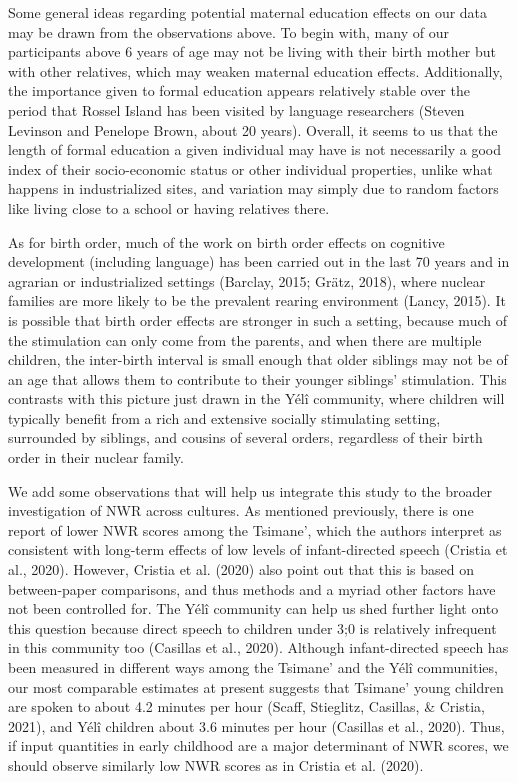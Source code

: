 \documentclass[english,,man,floatsintext]{apa6}
\begin{document}
Some general ideas regarding potential maternal education effects on our data may be drawn from the observations above. To begin with, many of our participants above 6 years of age may not be living with their birth mother but with other relatives, which may weaken maternal education effects. Additionally, the importance given to formal education appears relatively stable over the period that Rossel Island has been visited by language researchers (Steven Levinson and Penelope Brown, about 20 years). Overall, it seems to us that the length of formal education a given individual may have is not necessarily a good index of their socio-economic status or other individual properties, unlike what happens in industrialized sites, and variation may simply due to random factors like living close to a school or having relatives there.

As for birth order, much of the work on birth order effects on cognitive development (including language) has been carried out in the last 70 years and in agrarian or industrialized settings (Barclay, 2015; Grätz, 2018), where nuclear families are more likely to be the prevalent rearing environment (Lancy, 2015). It is possible that birth order effects are stronger in such a setting, because much of the stimulation can only come from the parents, and when there are multiple children, the inter-birth interval is small enough that older siblings may not be of an age that allows them to contribute to their younger siblings' stimulation. This contrasts with this picture just drawn in the Yélî community, where children will typically benefit from a rich and extensive socially stimulating setting, surrounded by siblings, and cousins of several orders, regardless of their birth order in their nuclear family.

We add some observations that will help us integrate this study to the broader investigation of NWR across cultures. As mentioned previously, there is one report of lower NWR scores among the Tsimane', which the authors interpret as consistent with long-term effects of low levels of infant-directed speech (Cristia et al., 2020). However, Cristia et al. (2020) also point out that this is based on between-paper comparisons, and thus methods and a myriad other factors have not been controlled for. The Yélî community can help us shed further light onto this question because direct speech to children under 3;0 is relatively infrequent in this community too (Casillas et al., 2020). Although infant-directed speech has been measured in different ways among the Tsimane' and the Yélî communities, our most comparable estimates at present suggests that Tsimane' young children are spoken to about 4.2 minutes per hour (Scaff, Stieglitz, Casillas, \& Cristia, 2021), and Yélî children about 3.6 minutes per hour (Casillas et al., 2020). Thus, if input quantities in early childhood are a major determinant of NWR scores, we should observe similarly low NWR scores as in Cristia et al. (2020).
\end{document}
